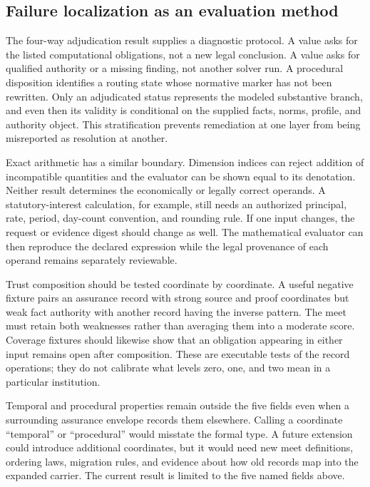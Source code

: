 \subsection{Failure localization as an evaluation method}

The four-way adjudication result supplies a diagnostic protocol. A  value asks for the listed computational obligations, not a new legal conclusion. A  value asks for qualified authority or a missing finding, not another solver run. A procedural disposition identifies a routing state whose normative marker has not been rewritten. Only an adjudicated status represents the modeled substantive branch, and even then its validity is conditional on the supplied facts, norms, profile, and authority object. This stratification prevents remediation at one layer from being misreported as resolution at another.

Exact arithmetic has a similar boundary. Dimension indices can reject addition of incompatible quantities and the evaluator can be shown equal to its denotation. Neither result determines the economically or legally correct operands. A statutory-interest calculation, for example, still needs an authorized principal, rate, period, day-count convention, and rounding rule. If one input changes, the request or evidence digest should change as well. The mathematical evaluator can then reproduce the declared expression while the legal provenance of each operand remains separately reviewable.

Trust composition should be tested coordinate by coordinate. A useful negative fixture pairs an assurance record with strong source and proof coordinates but weak fact authority with another record having the inverse pattern. The meet must retain both weaknesses rather than averaging them into a moderate score. Coverage fixtures should likewise show that an obligation appearing in either input remains open after composition. These are executable tests of the record operations; they do not calibrate what levels zero, one, and two mean in a particular institution.

Temporal and procedural properties remain outside the five fields even when a surrounding assurance envelope records them elsewhere. Calling a coordinate ``temporal'' or ``procedural'' would misstate the formal  type. A future extension could introduce additional coordinates, but it would need new meet definitions, ordering laws, migration rules, and evidence about how old records map into the expanded carrier. The current result is limited to the five named fields above.
